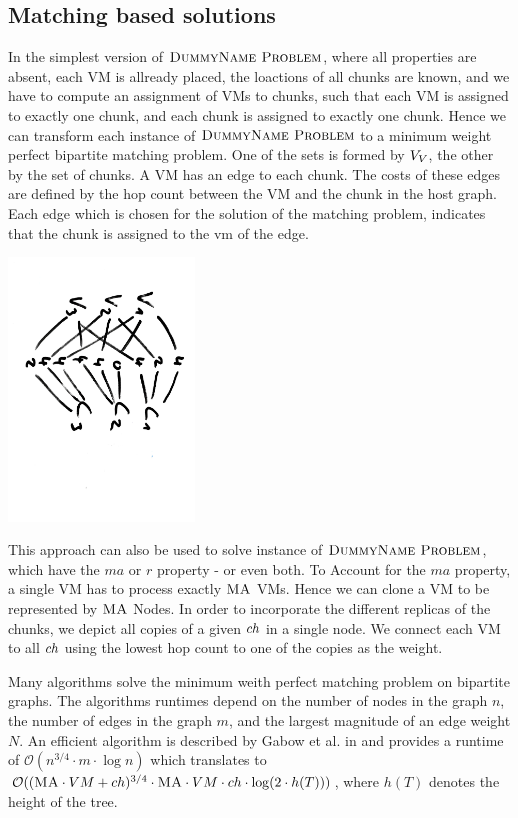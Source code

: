 \subsection{Matching based solutions} 

In the simplest version of $\textsc{DummyName Problem}$, where all properties are absent, each VM 
is allready placed, the loactions of all chunks are known, and we have to 
compute an assignment of VMs to chunks, such that each VM is assigned to 
exactly one chunk, and each chunk is assigned to exactly one chunk. Hence we 
can transform each instance of $\textsc{DummyName Problem}$ to a minimum weight perfect bipartite 
matching problem. One of the sets is formed by $V_V$, the other by the 
set of chunks. A VM has an edge to each chunk. The costs of these edges are 
defined by the hop count between the VM and the chunk in the host graph. Each 
edge which is chosen for the solution of the matching problem, indicates that 
the chunk is assigned to the vm of the edge.

\includegraphics[angle=90,origin=c, 
height=7cm]{figs/model_fig_skteches/matching_basic}

This approach can also be used to solve instance of $\textsc{DummyName Problem}$, which have the 
$ma$ or $r$ property - or even both. 
To Account for the $ma$ property, a single VM has to process exactly 
$\textsc{MA}$ VMs. Hence we can clone a VM to be represented by $\textsc{MA}$ Nodes.
In order to incorporate the different 
replicas of the chunks, we depict all copies of a given $ch$ in a 
single %
node. We connect each VM to all $ch$ using the 
lowest hop count to one of the copies as the weight.

Many algorithms solve the minimum weith perfect matching problem on bipartite 
graphs. The algorithms runtimes depend on  the number of nodes in the 
graph $n$, the number of edges in the graph $m$, and the largest magnitude of 
an edge weight $N$. An efficient algorithm is described by Gabow et al. in 
\cite{gabow_scaling_algorithm} and provides a runtime of $\mathcal{O}(n^{3/4} 
\cdot m \cdot \log n)$ which translates to $\mathcal{O}((\textsc{MA} \cdot VM + 
ch)^{3/4} \cdot  \textsc{MA} \cdot VM \cdot ch \cdot \log 
(2 \cdot h(T)))$, where $h(T)$ denotes the height of the tree.